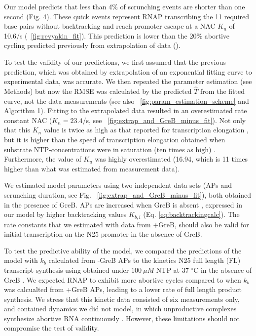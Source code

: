   
Our model predicts that less than 4\% of scrunching events are shorter than
one second (Fig. 4). These quick events represent RNAP transcribing the 11
required base pairs without backtracking and reach promoter escape at a NAC
$K_n$ of 10.6/s (\FIG~\ref{fig:revyakin_fit}). This prediction is lower than
the 20\% abortive cycling predicted previously from extrapolation of data
(\cite{revyakin_abortive_2006}).  

To test the validity of our predictions, we first assumed that the previous
prediction, which was obtained by extrapolation of an exponential fitting
curve to experimental data, was accurate. We then repeated the parameter
estimation (see Methods) but now the RMSE was calculated by the predicted
$\hat T$ from the fitted curve, not the data measurements (see also
\FIG~\ref{fig:param_estimation_scheme} and Algorithm 1). Fitting to the
extrapolated data resulted in an overestimated rate constant NAC
($K_n= 23.4$/s, see \FIG~\ref{fig:extrap_and_GreB_minus_fit}). Not only that
this $K_n$ value is twice as high as that reported for transcription
elongation \cite{revyakin_abortive_2006}, but it is higher than the speed of
transcription elongation obtained when substrate NTP-concentrations were in
saturation (ten times as high) \cite{bai_mechanochemical_2007}. Furthermore,
the value of $K_u$ was highly overestimated (16.94, which is 11 times higher
than what was estimated from measurement data). 



We estimated model parameters using two independent data sets (APs and
scrunching duration, see Fig. \FIG~\ref{fig:extrap_and_GreB_minus_fit}), both
obtained in the presence of GreB. APs are increased when GreB is absent
\cite{hsu_initial_2006}, expressed in our model by higher backtracking values
$K_{b,i}$ (Eq. \ref{eq:backtrackingcalc}). The rate constants that we
estimated with data from +GreB, should also be valid for initial
transcription on the N25 promoter in the absence of GreB.  

To test the predictive ability of the model, we compared the predictions of
the model with $k_b$ calculated from -GreB APs \cite{hsu_initial_2006} to the
kinetics N25 full length (FL) transcript synthesis using obtained under $100\
\mu M$ NTP at 37 $^{\circ}$C in the absence of GreB \cite{vo_vitro_2003-1}. We
expected RNAP to exhibit more abortive cycles compared to when $k_b$ was
calcualted from +GreB APs, leading to a lower rate of full length product
synthesis. We stress that this kinetic data consisted of six measurements
only, and contained dynamics we did not model, in which unproductive complexes
synthesize abortive RNA continuously \cite{vo_vitro_2003-1}. However, these
limitations should not compromise the test of validity.
 
